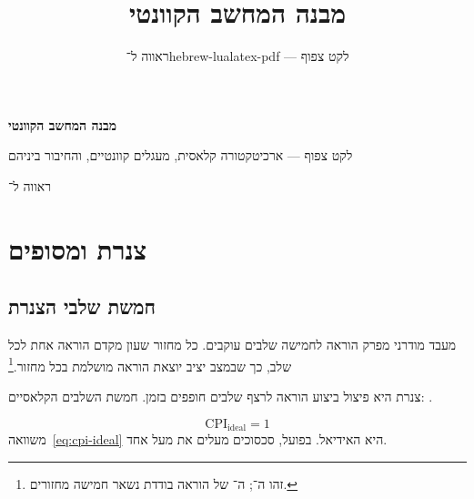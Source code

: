 
\usepackage{graphicx}

\title{מבנה המחשב הקוונטי}
\author{ראווה ל־hebrew-lualatex-pdf — לקט צפוף}
\date{}


\begin{titlepage}
\centering\vspace*{4.5cm}
{\LARGE\bfseries מבנה המחשב הקוונטי\par}
\vspace{1.2cm}
{\large לקט צפוף — ארכיטקטורה קלאסית, מעגלים קוונטיים, והחיבור ביניהם\par}
\vspace{0.6cm}
{\large ראווה ל־\par}
\vfill
\end{titlepage}

\tableofcontents
\clearpage

\part{צנרת ומסופים}

\chapter{חמשת שלבי הצנרת}
\label{ch:pipeline}

מעבד מודרני מפרק הוראה לחמישה שלבים עוקבים. כל מחזור שעון מקדם הוראה אחת לכל שלב,
כך שבמצב יציב יוצאת הוראה מושלמת בכל מחזור.\footnote{זהו ה־; ה־
של הוראה בודדת נשאר חמישה מחזורים.}

\begin{defbox}[frametitle={הגדרה — צנרת מודולרית}]
צנרת  היא פיצול ביצוע הוראה לרצף שלבים חופפים בזמן.
חמשת השלבים הקלאסיים: .
\end{defbox}

\begin{equation}
\label{eq:cpi-ideal}
\mathrm{CPI}_{\mathrm{ideal}} = 1
\end{equation}
משוואה~\eqref{eq:cpi-ideal} היא האידיאל. בפועל, סכסוכים מעלים את  מעל אחד.

